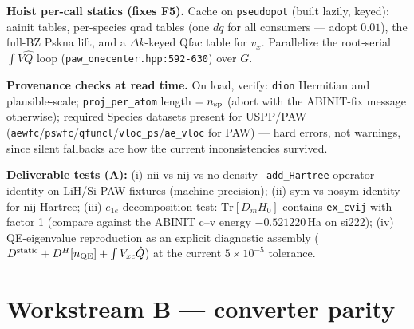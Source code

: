 \documentclass[11pt]{article}
\newcommand{\code}[1]{\texttt{\small #1}}
\newcommand{\file}[1]{\texttt{\small #1}}
\newcommand{\Dstat}{D^{\mathrm{static}}}
\newcommand{\Qhat}{\hat{Q}}
\begin{document}
\begin{description}[leftmargin=2.6em,style=nextline]
\item[A4.] \textbf{Hoist per-call statics (fixes F5).} Cache on
\code{pseudopot} (built lazily, keyed): aainit tables, per-species qrad
tables (one $dq$ for all consumers --- adopt $0.01$), the full-BZ Pskna
lift, and a $\Delta k$-keyed Qfac table for $v_x$. Parallelize the
root-serial $\int V \Qhat$ loop (\file{paw\_onecenter.hpp:592-630}) over
$G$.

\item[A5.] \textbf{Provenance checks at read time.} On load, verify:
\code{dion} Hermitian and plausible-scale; \code{proj\_per\_atom} length
$= n_{\rm sp}$ (abort with the ABINIT-fix message otherwise); required
Species datasets present for USPP/PAW
(\code{aewfc}/\code{pswfc}/\code{qfuncl}/\code{vloc\_ps}/\code{ae\_vloc}
for PAW) --- hard errors, not warnings, since silent fallbacks are how the
current inconsistencies survived.
\end{description}

\textbf{Deliverable tests (A):}
(i) nii vs nij vs no-density+\code{add\_Hartree} operator identity on
LiH/Si PAW fixtures (machine precision);
(ii) sym vs nosym identity for nij Hartree;
(iii) $e_{1e}$ decomposition test: $\mathrm{Tr}[D_m H_0]$ contains
\code{ex\_cvij} with factor 1 (compare against the ABINIT c--v energy
$-0.521220$\,Ha on si222);
(iv) QE-eigenvalue reproduction as an explicit diagnostic assembly
($\Dstat + D^H[n_{\rm QE}] + \int V_{xc}\Qhat$) at the current
$5\times10^{-5}$ tolerance.

\section{Workstream B --- converter parity}
\label{sec:wsB}
\end{document}
